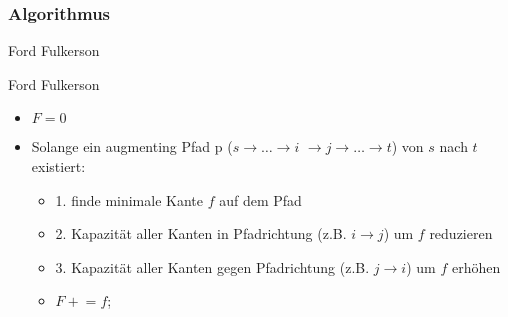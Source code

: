 \subsubsection{Algorithmus}
\begin{frame}{Ford Fulkerson}
  \begin{block}{Ford Fulkerson}
    \begin{itemize}
      \item $F = 0$
      \pause
      \item Solange ein augmenting Pfad p ($s \rightarrow\dots\rightarrow i$ $\rightarrow j\rightarrow\dots\rightarrow t$) von $s$ nach $t$ existiert:
      \pause
      \begin{itemize}
      \item 1. finde minimale Kante $f$ auf dem Pfad
      \pause
      \item 2. Kapazität aller Kanten in Pfadrichtung (z.B. $i\rightarrow j$) um $f$ reduzieren
      \pause
      \item 3. Kapazität aller Kanten gegen Pfadrichtung (z.B. $j\rightarrow i$) um $f$ erhöhen
      \pause
      \item $F \mathrel{+}= f$;
      \end{itemize}
    \end{itemize}
  \end{block}
\end{frame}
